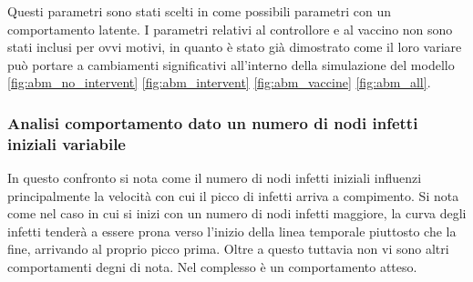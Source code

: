 Questi parametri sono stati scelti in come possibili parametri con un comportamento latente. I parametri 
relativi al controllore e al vaccino non sono stati inclusi per ovvi motivi, in quanto è stato già dimostrato 
come il loro variare può portare a cambiamenti significativi all'interno della simulazione del modello 
\ref{fig:abm_no_intervent} \ref{fig:abm_intervent} \ref{fig:abm_vaccine} \ref{fig:abm_all}.
\newpage

\subsubsection{Analisi comportamento dato un numero di nodi infetti iniziali variabile}
In questo confronto si nota come il numero di nodi infetti iniziali influenzi principalmente la velocità con cui 
il picco di infetti arriva a compimento. Si nota come nel caso in cui si inizi con un numero di nodi infetti maggiore, 
la curva degli infetti tenderà a essere prona verso l'inizio della linea temporale piuttosto che la fine, arrivando 
al proprio picco prima. Oltre a questo tuttavia non vi sono altri comportamenti degni di nota. Nel complesso è un
comportamento atteso.

